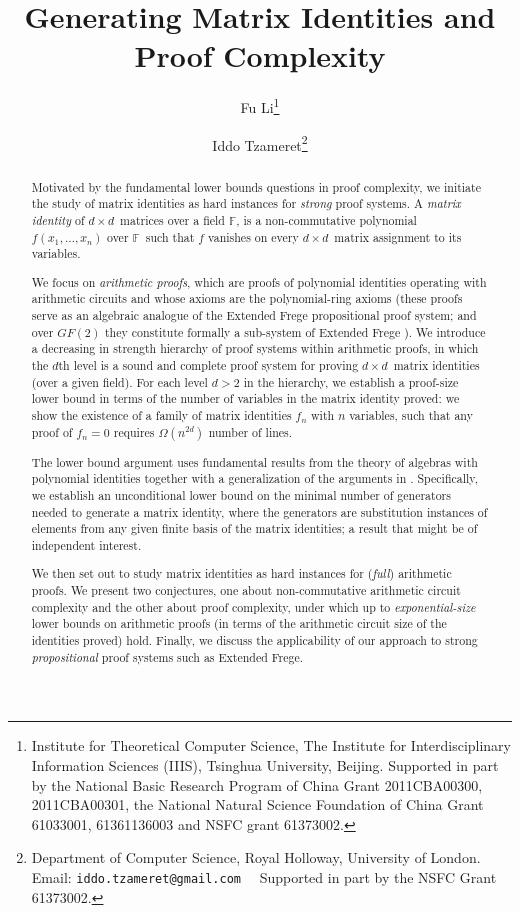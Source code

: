 \documentclass[12pt,reqno]{article}
\author{Fu Li\thanks{Institute for Theoretical Computer Science, The Institute for Interdisciplinary Information Sciences (IIIS), Tsinghua University, Beijing.  Supported in part by the National Basic Research Program of China Grant 2011CBA00300, 2011CBA00301, the National Natural Science Foundation of China Grant 61033001, 61361136003 and NSFC grant 61373002.} \and Iddo Tzameret\thanks{Department of Computer Science, Royal Holloway, University of London. Email:  \texttt{iddo.tzameret@gmail.com} ~~Supported in part by the NSFC Grant 61373002.}}
\newlength{\defbaselineskip}
\newcommand{\doublespacing}{\setlength{\baselineskip}{1.1\defbaselineskip}}
\newcommand\F{\ensuremath{\mathbb F}}
\newcommand{\dbyd}{\ensuremath{d\times d}}
\begin{document}
\title{Generating Matrix Identities and Proof Complexity}
\maketitle
\doublespacing
\thispagestyle{empty}
\begin{abstract}
Motivated by the fundamental lower bounds questions in proof complexity, we initiate the study of matrix identities as hard instances for \emph{strong} proof systems.
A \emph{matrix identity} of \dbyd\ matrices over a field \F, is a non-commutative polynomial \(f(x_1,\ldots,x_n)\) over \F\ such that $f$ vanishes on every \dbyd\ matrix assignment to its variables.

We focus on \textit{arithmetic proofs}, which are proofs of polynomial identities operating with arithmetic circuits and whose axioms are the polynomial-ring axioms (these proofs serve as an algebraic analogue of the Extended Frege propositional proof system; and over $GF(2)$ they   constitute formally a sub-system of Extended Frege \cite{HT12}). We introduce a decreasing in strength hierarchy of proof systems within arithmetic proofs, in which the $d$th level is a sound and complete proof system for proving \dbyd\ matrix identities (over a given field). For each level $d>2$ in the hierarchy, we establish a proof-size lower bound in terms of the number of variables in the matrix identity proved: we show the existence of a family of matrix identities $f_n$ with $n$ variables, such that any proof of $f_n=0$ requires $\Omega(n^{2d})$ number of lines.

The lower bound argument  uses fundamental results  from the theory of algebras with polynomial identities together with a generalization of the arguments in \cite{Hru11}. Specifically, we establish an unconditional lower bound on the minimal number of generators needed to generate a matrix identity, where the generators are substitution instances of elements from any given finite basis of the matrix identities; a result that might be of independent interest.


We then set out to study matrix identities as hard instances for (\textit{full}) arithmetic proofs. We present two conjectures, one about non-commutative arithmetic circuit complexity and the other about proof complexity, under which up to \textit{exponential-size} lower bounds on arithmetic proofs (in terms of the arithmetic circuit size of the identities proved) hold. Finally, we discuss the applicability of our approach to strong \textit{propositional} proof systems such as Extended Frege.




\end{abstract}
\end{document}

